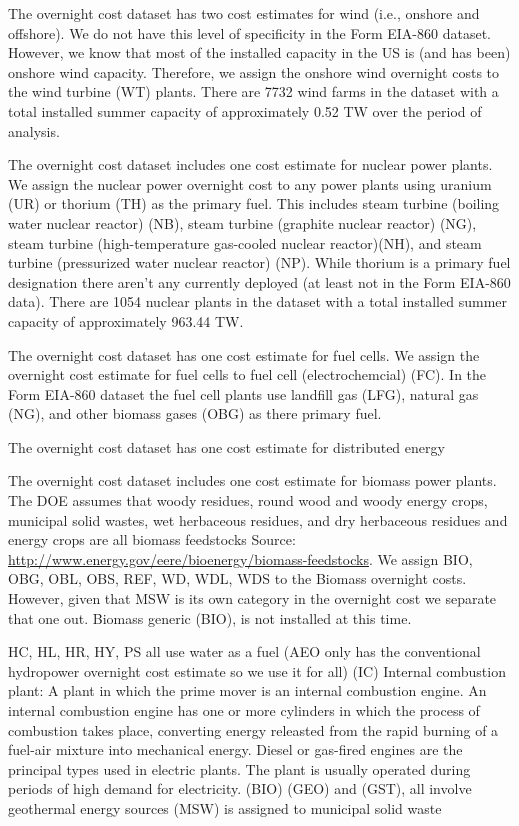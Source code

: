 \documentclass[10pt]{amsart}
\begin{document}
The overnight cost dataset has two cost estimates for wind (i.e., onshore and offshore).
We do not have this level of specificity in the Form EIA-860 dataset. 
However, we know that most of the installed capacity in the US is (and has been) onshore wind capacity. 
Therefore, we assign the onshore wind overnight costs to the wind turbine (WT) plants. 
There are 7732 wind farms in the dataset with a total installed summer capacity of approximately 0.52 TW over the period of analysis. 

The overnight cost dataset includes one cost estimate for nuclear power plants.
We assign the nuclear power overnight cost to any power plants using uranium (UR) or thorium (TH) as the primary fuel.  
This includes steam turbine (boiling water nuclear reactor) (NB), steam turbine (graphite nuclear reactor) (NG), steam turbine (high-temperature gas-cooled nuclear reactor)(NH), and steam turbine (pressurized water nuclear reactor) (NP).
While thorium is a primary fuel designation there aren't any currently deployed (at least not in the Form EIA-860 data).   
There are 1054 nuclear plants in the dataset with a total installed summer capacity of approximately 963.44 TW.

The overnight cost dataset has one cost estimate for fuel cells.
We assign the overnight cost estimate for fuel cells to fuel cell (electrochemcial) (FC). 
In the Form EIA-860 dataset the fuel cell plants use landfill gas (LFG), natural gas (NG), and other biomass gases (OBG) as there primary fuel. 

The overnight cost dataset has one cost estimate for distributed energy 

The overnight cost dataset includes one cost estimate for biomass power plants. 
The DOE assumes that woody residues, round wood and woody energy crops, municipal solid wastes, wet herbaceous residues, and dry herbaceous residues and energy 
crops are all biomass feedstocks Source: \url{http://www.energy.gov/eere/bioenergy/biomass-feedstocks}. 
We assign BIO, OBG, OBL, OBS, REF, WD, WDL, WDS to the Biomass overnight costs. However, given that MSW is its own category in the overnight cost we separate that one out.
 Biomass generic (BIO),  is not installed at this time.  
\begin{table}

\end{table}

HC, HL, HR, HY, PS all use water as a fuel (AEO only has the conventional hydropower overnight cost estimate so we use it for all)
(IC) Internal combustion plant: A plant in which the prime mover is an internal combustion engine. An internal combustion engine has one or more cylinders in which the process of combustion takes place, converting energy releasted from the rapid burning of a fuel-air mixture into mechanical energy. Diesel or gas-fired engines are the principal types used in electric plants. The plant is usually operated during periods of high demand for electricity.
(BIO) 
(GEO) and (GST), all involve geothermal energy sources
(MSW) is assigned to municipal solid waste
\end{document}
